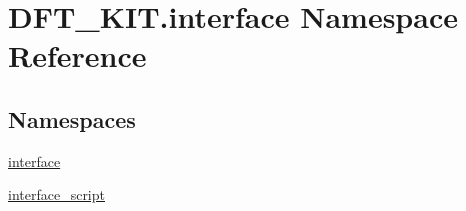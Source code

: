 \hypertarget{namespace_d_f_t___k_i_t_1_1interface}{\section{D\+F\+T\+\_\+\+K\+I\+T.\+interface Namespace Reference}
\label{namespace_d_f_t___k_i_t_1_1interface}
}
\subsection*{Namespaces}
\begin{DoxyCompactItemize}
\item 
 \hyperlink{namespace_d_f_t___k_i_t_1_1interface_1_1interface}{interface}
\item 
 \hyperlink{namespace_d_f_t___k_i_t_1_1interface_1_1interface__script}{interface\+\_\+script}
\end{DoxyCompactItemize}
